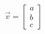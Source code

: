 \documentclass[preview]{standalone}
\begin{document}
\begin{align*}
\vec{v} = \begin{bmatrix} a \\ b \\ c \end{bmatrix}
\end{align*}
\end{document}
